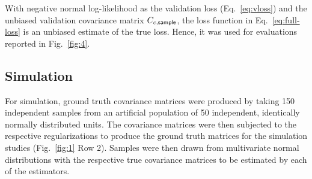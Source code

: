 With negative normal log-likelihood as the validation loss  (Eq.~\ref{eq:vloss}) and the unbiased validation covariance matrix $C_{c,\sf sample}$, the loss function in Eq.~\ref{eq:full-loss} is an unbiased estimate of the true loss. Hence, it was used for evaluations reported in Fig.~\ref{fig:4}.

\subsection*{Simulation}
For simulation, ground truth covariance matrices were produced by taking 150 independent samples from an artificial population of 50 independent, identically normally distributed units. The covariance matrices were then subjected to the respective regularizations to produce the ground truth matrices for the simulation studies (Fig.~\ref{fig:1} Row 2). Samples were then drawn from multivariate normal distributions with the respective true covariance matrices to be estimated by each of the estimators.
